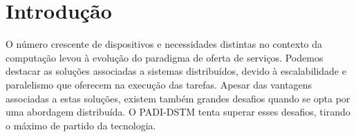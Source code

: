 \section{Introdução}

O número crescente de dispositivos e necessidades distintas no contexto da computação levou à evolução do paradigma de oferta de serviços. Podemos destacar as soluções associadas a sistemas distribuídos, devido à escalabilidade e paralelismo que oferecem na execução das tarefas. Apesar das vantagens associadas a estas soluções, existem também grandes desafios quando se opta por uma abordagem distribuída. O PADI-DSTM tenta superar esses desafios, tirando o máximo de partido da tecnologia.